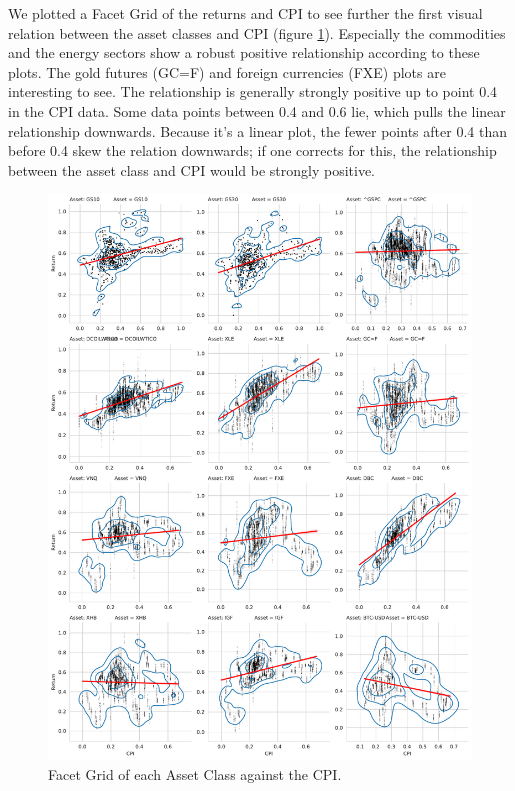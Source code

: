 \documentclass{article}
\begin{document}
We plotted a Facet Grid of the returns and CPI to see further the first visual relation between the asset classes and CPI (figure \ref{fig:mesh6}). Especially the commodities and the energy sectors show a robust positive relationship according to these plots. The gold futures (GC=F) and foreign currencies (FXE) plots are interesting to see. The relationship is generally strongly positive up to point 0.4 in the CPI data. Some data points between 0.4 and 0.6 lie, which pulls the linear relationship downwards. Because it's a linear plot, the fewer points after 0.4 than before 0.4 skew the relation downwards; if one corrects for this, the relationship between the asset class and CPI would be strongly positive.

\begin{figure}[H]
    \centering
    \includegraphics[width=1\textwidth]{figure/CPI_Returns.pdf}
    \caption{Facet Grid of each Asset Class against the CPI.}
    \label{fig:mesh6}
\end{figure}
\end{document}

